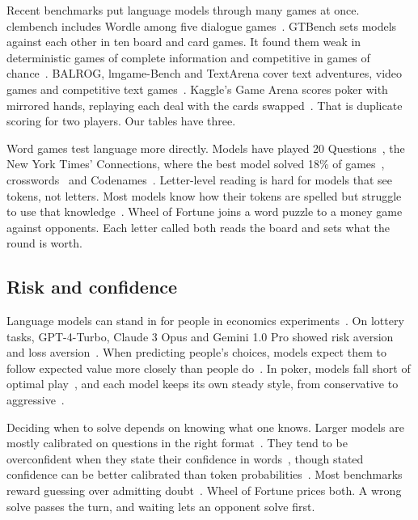 Recent benchmarks put language models through many games at once. clembench includes Wordle among five dialogue games~\citep{chalamalasetti2023clembench}. GTBench sets models against each other in ten board and card games. It found them weak in deterministic games of complete information and competitive in games of chance~\citep{duan2024gtbench}. BALROG, lmgame-Bench and TextArena cover text adventures, video games and competitive text games~\citep{paglieri2025balrog,hu2026lmgamebench,textarena}. Kaggle's Game Arena scores poker with mirrored hands, replaying each deal with the cards swapped~\citep{doerschuktiberi2026gamearena}. That is duplicate scoring for two players. Our tables have three.

Word games test language more directly. Models have played 20 Questions~\citep{zhang2024probing}, the New York Times' Connections, where the best model solved 18\% of games~\citep{samdarshi2024connecting}, crosswords~\citep{saha2025crossword} and Codenames~\citep{stephenson2025codenames}. Letter-level reading is hard for models that see tokens, not letters. Most models know how their tokens are spelled but struggle to use that knowledge~\citep{edman2024cute}. Wheel of Fortune joins a word puzzle to a money game against opponents. Each letter called both reads the board and sets what the round is worth.

\subsection{Risk and confidence}

Language models can stand in for people in economics experiments~\citep{horton2023homo}. On lottery tasks, GPT-4-Turbo, Claude 3 Opus and Gemini 1.0 Pro showed risk aversion and loss aversion~\citep{jia2024decision}. When predicting people's choices, models expect them to follow expected value more closely than people do~\citep{liu2025rational}. In poker, models fall short of optimal play~\citep{zhuang2025pokerbench}, and each model keeps its own steady style, from conservative to aggressive~\citep{rong2026risk}.

Deciding when to solve depends on knowing what one knows. Larger models are mostly calibrated on questions in the right format~\citep{kadavath2022know}. They tend to be overconfident when they state their confidence in words~\citep{xiong2024uncertainty}, though stated confidence can be better calibrated than token probabilities~\citep{tian2023calibration}. Most benchmarks reward guessing over admitting doubt~\citep{kalai2025hallucinate}. Wheel of Fortune prices both. A wrong solve passes the turn, and waiting lets an opponent solve first.


